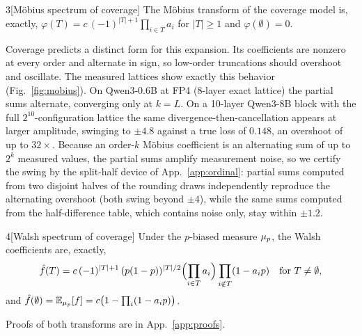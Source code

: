 \begin{customthm}{3}[M\"obius spectrum of coverage]\label{thm:mobius}
The M\"obius transform of the coverage model is, exactly,
$\varphi(T) = c\,(-1)^{|T|+1}\prod_{i\in T} a_i$ for $|T|\ge 1$ and $\varphi(\emptyset)=0$.
\end{customthm}

Coverage predicts a distinct form for this expansion. Its coefficients are nonzero at
every order and alternate in sign, so low-order truncations should overshoot and oscillate. 
The measured lattices show exactly this behavior
(Fig.~\ref{fig:mobius}). On Qwen3-0.6B at FP4 (8-layer exact lattice) the partial sums alternate, 
converging only at
$k=L$. On a 10-layer Qwen3-8B block with the full $2^{10}$-configuration lattice the same
divergence-then-cancellation appears at larger amplitude, swinging to $\pm 4.8$ against a true loss of
$0.148$, an overshoot of up to $32\times$. Because an order-$k$ M\"obius coefficient is an
alternating sum of up to $2^k$ measured values, the partial sums amplify measurement noise, so we
certify the swing by the split-half device of App.~\ref{app:ordinal}: partial sums computed from two
disjoint halves of the rounding draws independently reproduce the alternating overshoot (both swing
beyond $\pm 4$), while the same sums computed from the half-difference table, which contains noise
only, stay within $\pm 1.2$.

\begin{customthm}{4}[Walsh spectrum of coverage]\label{thm:walshspec}
Under the $p$-biased measure $\mu_p$, the Walsh coefficients are, exactly,
\[
  \hat f(T) = c\,(-1)^{|T|+1}\,(p(1-p))^{|T|/2}\Bigl(\prod_{i\in T} a_i\Bigr)\prod_{i\notin T}(1 - a_i p)
  \quad\text{for } T \ne \emptyset,
\]
and $\hat f(\emptyset) = \mathbb{E}_{\mu_p}[f] = c\bigl(1 - \prod_{i}(1 - a_i p)\bigr)$.
\end{customthm}

Proofs of both transforms are in App.~\ref{app:proofs}. 

